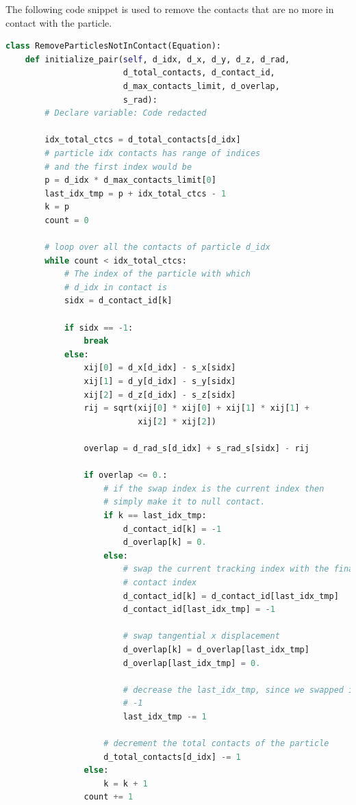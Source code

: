 The following code snippet is used to remove the contacts that are no more in
contact with the particle.
 \lstset{basicstyle=\footnotesize\ttfamily}
\begin{lstlisting}[label={contact:equations},frame=lines,language=Python,upquote=True]
class RemoveParticlesNotInContact(Equation):
    def initialize_pair(self, d_idx, d_x, d_y, d_z, d_rad,
                        d_total_contacts, d_contact_id,
                        d_max_contacts_limit, d_overlap,
                        s_rad):
        # Declare variable: Code redacted

        idx_total_ctcs = d_total_contacts[d_idx]
        # particle idx contacts has range of indices
        # and the first index would be
        p = d_idx * d_max_contacts_limit[0]
        last_idx_tmp = p + idx_total_ctcs - 1
        k = p
        count = 0

        # loop over all the contacts of particle d_idx
        while count < idx_total_ctcs:
            # The index of the particle with which
            # d_idx in contact is
            sidx = d_contact_id[k]

            if sidx == -1:
                break
            else:
                xij[0] = d_x[d_idx] - s_x[sidx]
                xij[1] = d_y[d_idx] - s_y[sidx]
                xij[2] = d_z[d_idx] - s_z[sidx]
                rij = sqrt(xij[0] * xij[0] + xij[1] * xij[1] +
                           xij[2] * xij[2])

                overlap = d_rad_s[d_idx] + s_rad_s[sidx] - rij

                if overlap <= 0.:
                    # if the swap index is the current index then
                    # simply make it to null contact.
                    if k == last_idx_tmp:
                        d_contact_id[k] = -1
                        d_overlap[k] = 0.
                    else:
                        # swap the current tracking index with the final
                        # contact index
                        d_contact_id[k] = d_contact_id[last_idx_tmp]
                        d_contact_id[last_idx_tmp] = -1

                        # swap tangential x displacement
                        d_overlap[k] = d_overlap[last_idx_tmp]
                        d_overlap[last_idx_tmp] = 0.

                        # decrease the last_idx_tmp, since we swapped it to
                        # -1
                        last_idx_tmp -= 1

                    # decrement the total contacts of the particle
                    d_total_contacts[d_idx] -= 1
                else:
                    k = k + 1
                count += 1
\end{lstlisting}

